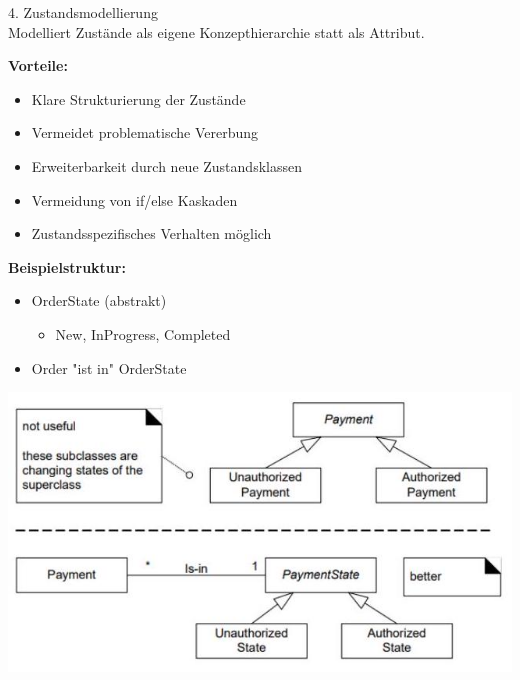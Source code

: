 \begin{concept}{4. Zustandsmodellierung}\\
Modelliert Zustände als eigene Konzepthierarchie statt als Attribut.

\textbf{Vorteile:}
\begin{itemize}
    \item Klare Strukturierung der Zustände
    \item Vermeidet problematische Vererbung
    \item Erweiterbarkeit durch neue Zustandsklassen
    \item Vermeidung von if/else Kaskaden
    \item Zustandsspezifisches Verhalten möglich
\end{itemize}

\textbf{Beispielstruktur:}
\begin{itemize}
    \item OrderState (abstrakt)
    \begin{itemize}
        \item New, InProgress, Completed
    \end{itemize}
    \item Order "ist in" OrderState
\end{itemize}
\includegraphics[width=0.9\linewidth]{images/2024_12_29_0d1d7b5551ea1b4b41bdg-07(1)}
\end{concept}


